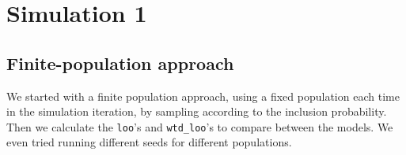 \documentclass[
]{article}
\begin{document}
\hypertarget{simulation-1}{%
\section{Simulation 1}\label{simulation-1}}

\hypertarget{finite-population-approach}{%
\subsection{Finite-population
approach}\label{finite-population-approach}}

We started with a finite population approach, using a fixed population
each time in the simulation iteration, by sampling according to the
inclusion probability. Then we calculate the \texttt{loo}'s and
\texttt{wtd\_loo}'s to compare between the models. We even tried running
different seeds for different populations.
\end{document}
